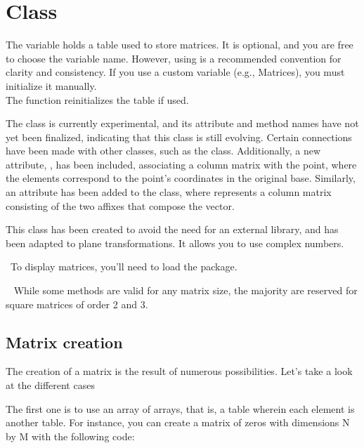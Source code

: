 \newpage\section{Class  }

The variable  holds a table used to store matrices. It is optional, and you are free to choose the variable name. However, using  is a recommended convention for clarity and consistency. If you use a custom variable (e.g., Matrices), you must initialize it manually.\\
The  function reinitializes the  table if used.

\vspace{1em}

The  class is currently experimental, and its attribute and method names have not yet been finalized, indicating that this class is still evolving. Certain connections have been made with other classes, such as the  class. Additionally, a new attribute, , has been included, associating a column matrix with the point, where the elements correspond to the point's coordinates in the original base. Similarly, an attribute has been added to the  class, where  represents a column matrix consisting of the two affixes that compose the vector.

This  class has been created to avoid the need for an external library, and has been adapted to plane transformations. It allows you to use complex numbers.

\lefthand\ To display matrices, you'll need to load the  package.

{\color{red}\lefthand\ } While some methods are valid for any matrix size, the majority are reserved for square matrices of order 2 and 3.


\subsection{Matrix creation}
\label{sub:matrix_creation}

The creation of a matrix is the result of numerous possibilities. Let's take a look at the different cases

The first one is to use an array of arrays, that is, a table wherein each element is another table. For instance, you can create a matrix of zeros with dimensions N by M with the following code:


